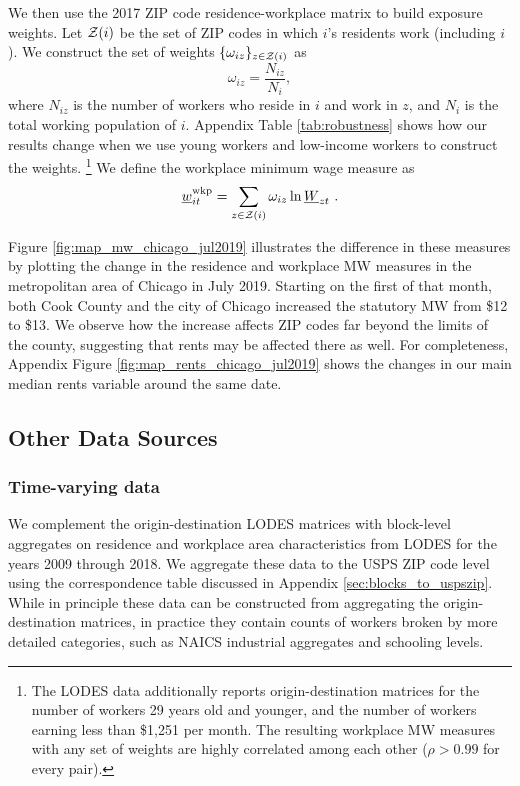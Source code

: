 We then use the 2017 ZIP code residence-workplace matrix to build exposure 
weights.
Let $\mathcal{Z}(i)$ be the set of ZIP codes in which $i$'s residents work 
(including $i$).
We construct the set of weights $\{\omega_{iz}\}_{z\in\mathcal{Z}(i)}$ as 
$$
\omega_{iz} = \frac{N_{iz}}{N_i} ,
$$
where 
$N_{iz}$ is the number of workers who reside in $i$ and work in $z$, 
and $N_i$ is the total working population of $i$.
Appendix Table \ref{tab:robustness} shows how our results change when we 
use young workers and low-income workers to construct the weights.%
\footnote{The LODES data additionally reports origin-destination matrices for 
the number of workers 29 years old and younger, and the number of workers 
earning less than \$1,251 per month.
The resulting workplace MW measures with any set of weights are highly correlated 
among each other ($\rho>0.99$ for every pair).}
We define the workplace minimum wage measure as
\begin{equation}
    \underline{w}^{\text{wkp}}_{it} = \sum_{z\in\mathcal{Z}(i)} \omega_{iz} \ln \underline{W}_{zt} \ .
\end{equation}

Figure \ref{fig:map_mw_chicago_jul2019} illustrates the difference in these 
measures by plotting the change in the residence and workplace MW measures 
in the metropolitan area of Chicago in July 2019.
Starting on the first of that month, both Cook County and the city of Chicago 
increased the statutory MW from \$12 to \$13.
We observe how the increase affects ZIP codes far beyond the limits of the 
county, suggesting that rents may be affected there as well.
For completeness, Appendix Figure \ref{fig:map_rents_chicago_jul2019} shows
the changes in our main median rents variable around the same date.


\subsection{Other Data Sources}\label{sec:data_other}

\subsubsection{Time-varying data}
\label{sec:data_other_timevarying}

We complement the origin-destination LODES matrices with block-level aggregates 
on residence and workplace area characteristics from LODES 
\parencite{CensusLODES} for the years 2009 through 2018.
We aggregate these data to the USPS ZIP code level using the correspondence
table discussed in Appendix \ref{sec:blocks_to_uspszip}.
While in principle these data can be constructed from aggregating the 
origin-destination matrices, in practice they contain counts of workers broken
by more detailed categories, such as NAICS industrial aggregates and 
schooling levels.

